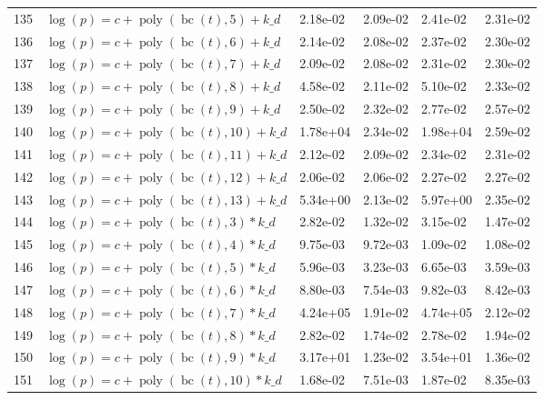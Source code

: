 \documentclass[12pt,a4paper]{article}
\DeclareMathOperator{\bc}{bc}
\DeclareMathOperator{\poly}{poly}
\begin{document}
\begin{longtable}[t]{ll>{\raggedleft\arraybackslash}p{2cm}>{\raggedleft\arraybackslash}p{2cm}>{\raggedleft\arraybackslash}p{2cm}>{\raggedleft\arraybackslash}p{2cm}}
\rowcolor{gray!6}  135 & $\log(p) = c + \poly\left( \bc(t), 5 \right) + k\_d$ & 2.18e-02 & 2.09e-02 & 2.41e-02 & 2.31e-02\\
136 & $\log(p) = c + \poly\left( \bc(t), 6 \right) + k\_d$ & 2.14e-02 & 2.08e-02 & 2.37e-02 & 2.30e-02\\
\rowcolor{gray!6}  137 & $\log(p) = c + \poly\left( \bc(t), 7 \right) + k\_d$ & 2.09e-02 & 2.08e-02 & 2.31e-02 & 2.30e-02\\
138 & $\log(p) = c + \poly\left( \bc(t), 8 \right) + k\_d$ & 4.58e-02 & 2.11e-02 & 5.10e-02 & 2.33e-02\\
\rowcolor{gray!6}  139 & $\log(p) = c + \poly\left( \bc(t), 9 \right) + k\_d$ & 2.50e-02 & 2.32e-02 & 2.77e-02 & 2.57e-02\\
140 & $\log(p) = c + \poly\left( \bc(t), 10 \right) + k\_d$ & 1.78e+04 & 2.34e-02 & 1.98e+04 & 2.59e-02\\
\rowcolor{gray!6}  141 & $\log(p) = c + \poly\left( \bc(t), 11 \right) + k\_d$ & 2.12e-02 & 2.09e-02 & 2.34e-02 & 2.31e-02\\
142 & $\log(p) = c + \poly\left( \bc(t), 12 \right) + k\_d$ & 2.06e-02 & 2.06e-02 & 2.27e-02 & 2.27e-02\\
\rowcolor{gray!6}  143 & $\log(p) = c + \poly\left( \bc(t), 13 \right) + k\_d$ & 5.34e+00 & 2.13e-02 & 5.97e+00 & 2.35e-02\\
144 & $\log(p) = c + \poly\left( \bc(t), 3 \right) * k\_d$ & 2.82e-02 & 1.32e-02 & 3.15e-02 & 1.47e-02\\
\rowcolor{gray!6}  145 & $\log(p) = c + \poly\left( \bc(t), 4 \right) * k\_d$ & 9.75e-03 & 9.72e-03 & 1.09e-02 & 1.08e-02\\
146 & $\log(p) = c + \poly\left( \bc(t), 5 \right) * k\_d$ & 5.96e-03 & 3.23e-03 & 6.65e-03 & 3.59e-03\\
\rowcolor{gray!6}  147 & $\log(p) = c + \poly\left( \bc(t), 6 \right) * k\_d$ & 8.80e-03 & 7.54e-03 & 9.82e-03 & 8.42e-03\\
148 & $\log(p) = c + \poly\left( \bc(t), 7 \right) * k\_d$ & 4.24e+05 & 1.91e-02 & 4.74e+05 & 2.12e-02\\
\rowcolor{gray!6}  149 & $\log(p) = c + \poly\left( \bc(t), 8 \right) * k\_d$ & 2.82e-02 & 1.74e-02 & 2.78e-02 & 1.94e-02\\
150 & $\log(p) = c + \poly\left( \bc(t), 9 \right) * k\_d$ & 3.17e+01 & 1.23e-02 & 3.54e+01 & 1.36e-02\\
\rowcolor{gray!6}  151 & $\log(p) = c + \poly\left( \bc(t), 10 \right) * k\_d$ & 1.68e-02 & 7.51e-03 & 1.87e-02 & 8.35e-03\\

\end{longtable}
\end{document}

